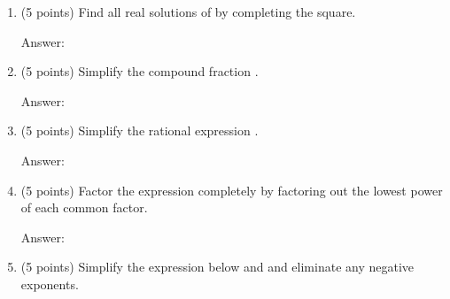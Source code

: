 \documentclass[12pt]{article}
\begin{document}
\newpage
\begin{enumerate}
\item (5 points) Find all real solutions of \scalebox{1.2}{$ 2x^2-3x-1=0$} by completing the square.\\

\begin{flushright}{ Answer:\underline{\hspace{2in}}}\end{flushright}
\vfill
\item (5 points) Simplify the compound fraction .
\begin{flushright}{ Answer:\underline{\hspace{2in}}}\end{flushright}
\vfill
\item (5 points) Simplify the rational expression .
\begin{flushright}{ Answer:\underline{\hspace{2in}}}\end{flushright}
\vfill
\item (5 points) Factor the expression  completely by factoring out the lowest power of each common factor.
\begin{flushright}{ Answer:\underline{\hspace{2in}}}\end{flushright}
\vfill
\newpage


\item (5 points) Simplify the expression below and  and eliminate any negative exponents.\\


\end{enumerate}
\end{document}
